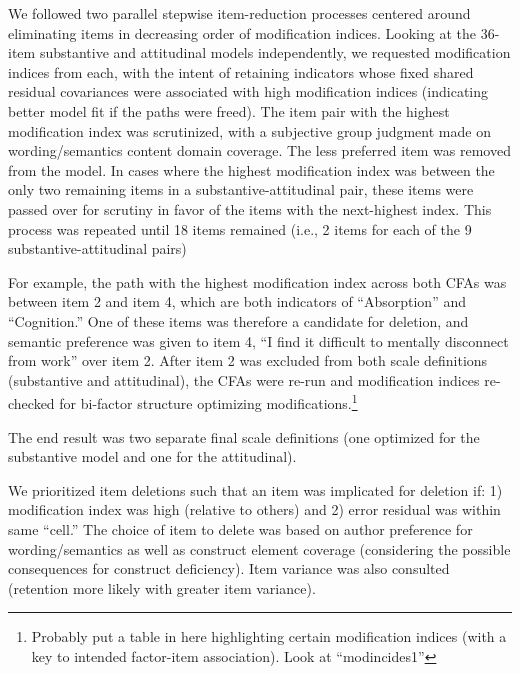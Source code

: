 \documentclass[
  english,
  man]{apa6}
\begin{document}
We followed two parallel stepwise item-reduction processes centered around eliminating items in decreasing order of modification indices. Looking at the 36-item substantive and attitudinal models independently, we requested modification indices from each, with the intent of retaining indicators whose fixed shared residual covariances were associated with high modification indices (indicating better model fit if the paths were freed). The item pair with the highest modification index was scrutinized, with a subjective group judgment made on wording/semantics content domain coverage. The less preferred item was removed from the model. In cases where the highest modification index was between the only two remaining items in a substantive-attitudinal pair, these items were passed over for scrutiny in favor of the items with the next-highest index. This process was repeated until 18 items remained (i.e., 2 items for each of the 9 substantive-attitudinal pairs)

For example, the path with the highest modification index across both CFAs was between item 2 and item 4, which are both indicators of ``Absorption'' and ``Cognition.'' One of these items was therefore a candidate for deletion, and semantic preference was given to item 4, ``I find it difficult to mentally disconnect from work'' over item 2. After item 2 was excluded from both scale definitions (substantive and attitudinal), the CFAs were re-run and modification indices re-checked for bi-factor structure optimizing modifications.\footnote{Probably put a table in here highlighting certain modification indices (with a key to intended factor-item association). Look at ``modincides1''}

The end result was two separate final scale definitions (one optimized for the substantive model and one for the attitudinal).

We prioritized item deletions such that an item was implicated for deletion if: 1) modification index was high (relative to others) and 2) error residual was within same ``cell.'' The choice of item to delete was based on author preference for wording/semantics as well as construct element coverage (considering the possible consequences for construct deficiency). Item variance was also consulted (retention more likely with greater item variance).
\end{document}
